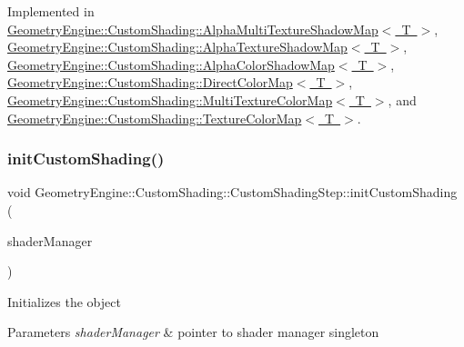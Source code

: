 Implemented in \mbox{\hyperlink{class_geometry_engine_1_1_custom_shading_1_1_alpha_multi_texture_shadow_map_a6bd8b95d6b83ac8513e4885899c33a19}{Geometry\+Engine\+::\+Custom\+Shading\+::\+Alpha\+Multi\+Texture\+Shadow\+Map$<$ T $>$}}, \mbox{\hyperlink{class_geometry_engine_1_1_custom_shading_1_1_alpha_texture_shadow_map_a338fc51d0712fa02fa4d23baa4fa2daa}{Geometry\+Engine\+::\+Custom\+Shading\+::\+Alpha\+Texture\+Shadow\+Map$<$ T $>$}}, \mbox{\hyperlink{class_geometry_engine_1_1_custom_shading_1_1_alpha_color_shadow_map_aa0c198d25f5486aba85f44fcd02c8074}{Geometry\+Engine\+::\+Custom\+Shading\+::\+Alpha\+Color\+Shadow\+Map$<$ T $>$}}, \mbox{\hyperlink{class_geometry_engine_1_1_custom_shading_1_1_direct_color_map_a22949fb9c7ae04a6bacc001034c41a04}{Geometry\+Engine\+::\+Custom\+Shading\+::\+Direct\+Color\+Map$<$ T $>$}}, \mbox{\hyperlink{class_geometry_engine_1_1_custom_shading_1_1_multi_texture_color_map_a501944cf2165e0f11d20cb84c25a417b}{Geometry\+Engine\+::\+Custom\+Shading\+::\+Multi\+Texture\+Color\+Map$<$ T $>$}}, and \mbox{\hyperlink{class_geometry_engine_1_1_custom_shading_1_1_texture_color_map_a99a77c4dc1deb9e149121a65f5a1a1af}{Geometry\+Engine\+::\+Custom\+Shading\+::\+Texture\+Color\+Map$<$ T $>$}}.

\mbox{\label{class_geometry_engine_1_1_custom_shading_1_1_custom_shading_step_a219df9763bb85663703d763589930025}} 
\subsubsection{\texorpdfstring{initCustomShading()}{initCustomShading()}}
{\footnotesize\ttfamily void Geometry\+Engine\+::\+Custom\+Shading\+::\+Custom\+Shading\+Step\+::init\+Custom\+Shading (\begin{DoxyParamCaption}\item[{\mbox{\hyperlink{class_shader_files_1_1_shader_manager}{Shader\+Files\+::\+Shader\+Manager}} $\ast$}]{shader\+Manager }\end{DoxyParamCaption})\hspace{0.3cm}{\ttfamily [virtual]}}

Initializes the object 
\begin{DoxyParams}{Parameters}
{\em shader\+Manager} & pointer to shader manager singleton \\
\hline
\end{DoxyParams}
\mbox{\label{class_geometry_engine_1_1_custom_shading_1_1_custom_shading_step_a7c0d840ea439baec320622473a409d49}} 
